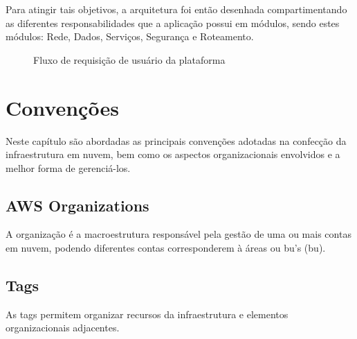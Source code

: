 \documentclass[12pt, a4paper]{report}
\begin{document}
Para atingir tais objetivos, a arquitetura foi então desenhada compartimentando as diferentes responsabilidades que a aplicação possui em módulos, sendo estes módulos: Rede, Dados, Serviços, Segurança e Roteamento.

\begin{center}
	\begin{figure}[H]
		\noindent{}
		\caption{Fluxo de requisição de usuário da plataforma}\label{fig:01-overview}
	\end{figure}
\end{center}

\section{Convenções}

Neste capítulo são abordadas as principais convenções adotadas na confecção da infraestrutura em nuvem, bem como os aspectos organizacionais envolvidos e a melhor forma de gerenciá-los.

\subsection{AWS Organizations}

A organização é a macroestrutura responsável pela gestão de uma ou mais contas em nuvem, podendo diferentes contas corresponderem à áreas ou \acrshort{bu}'s (\acrlong{bu}).

\subsection{Tags}

As tags permitem organizar recursos da infraestrutura e elementos organizacionais adjacentes.
\end{document}
